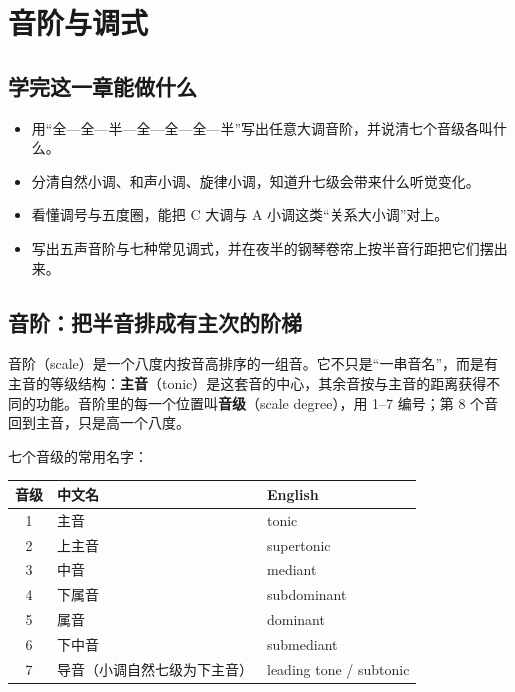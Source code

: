 \clearpage
\chapter{音阶与调式}


\label{chap:scales-and-modes}

\section*{学完这一章能做什么}
\begin{itemize}
  \item 用“全—全—半—全—全—全—半”写出任意大调音阶，并说清七个音级各叫什么。
  \item 分清自然小调、和声小调、旋律小调，知道升七级会带来什么听觉变化。
  \item 看懂调号与五度圈，能把 C 大调与 A 小调这类“关系大小调”对上。
  \item 写出五声音阶与七种常见调式，并在夜半的钢琴卷帘上按半音行距把它们摆出来。
\end{itemize}

\section{音阶：把半音排成有主次的阶梯}

音阶（scale）是一个八度内按音高排序的一组音。它不只是“一串音名”，而是有主音的等级结构：\textbf{主音}（tonic）是这套音的中心，其余音按与主音的距离获得不同的功能。音阶里的每一个位置叫\textbf{音级}（scale degree），用 1–7 编号；第 8 个音回到主音，只是高一个八度。

七个音级的常用名字：

\begin{center}
\small
\begin{tabular}{cll}
\toprule
音级 & 中文名 & English \\
\midrule
1 & 主音 & tonic \\
2 & 上主音 & supertonic \\
3 & 中音 & mediant \\
4 & 下属音 & subdominant \\
5 & 属音 & dominant \\
6 & 下中音 & submediant \\
7 & 导音（小调自然七级为下主音） & leading tone / subtonic \\
\bottomrule
\end{tabular}
\end{center}

